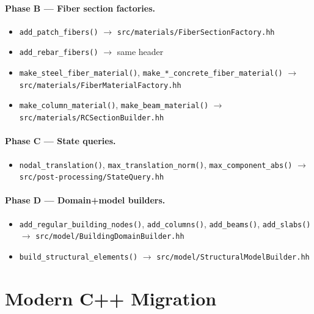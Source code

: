 \paragraph{Phase B --- Fiber section factories.}
\begin{itemize}
  \item \texttt{add\_patch\_fibers()}
        $\to$ \texttt{src/materials/FiberSectionFactory.hh}
  \item \texttt{add\_rebar\_fibers()}
        $\to$ same header
  \item \texttt{make\_steel\_fiber\_material()},
        \texttt{make\_*\_concrete\_fiber\_material()}
        $\to$ \texttt{src/materials/FiberMaterialFactory.hh}
  \item \texttt{make\_column\_material()},
        \texttt{make\_beam\_material()}
        $\to$ \texttt{src/materials/RCSectionBuilder.hh}
\end{itemize}

\paragraph{Phase C --- State queries.}
\begin{itemize}
  \item \texttt{nodal\_translation()},
        \texttt{max\_translation\_norm()},
        \texttt{max\_component\_abs()}
        $\to$ \texttt{src/post-processing/StateQuery.hh}
\end{itemize}

\paragraph{Phase D --- Domain+model builders.}
\begin{itemize}
  \item \texttt{add\_regular\_building\_nodes()}, \texttt{add\_columns()},
        \texttt{add\_beams()}, \texttt{add\_slabs()}
        $\to$ \texttt{src/model/BuildingDomainBuilder.hh}
  \item \texttt{build\_structural\_elements()}
        $\to$ \texttt{src/model/StructuralModelBuilder.hh}
\end{itemize}


\section{Modern C++ Migration}
\label{sec:cpp23-migration}

